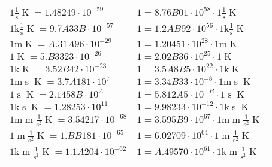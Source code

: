 \begin{center}
\begin{longtable}{l l}
{\color{black}$1 \bm{\mathrm{ }}{}\frac1{\operatorname{s}}{}{\operatorname{K}} = 1.48249\cdot10^{-59} $}   & {\color{black}$ 1 = 8.76B01\cdot10^{58} \cdot 1 \bm{\mathrm{ }}{}\frac1{\operatorname{s}}{}{\operatorname{K}}$}  \\
{\color{gray}$1 \bm{\mathrm{ k}}{}\frac1{\operatorname{s}}{}{\operatorname{K}} = 9.7A33B\cdot10^{-57} $}   & {\color{gray}$ 1 = 1.2AB92\cdot10^{56} \cdot 1 \bm{\mathrm{ k}}{}\frac1{\operatorname{s}}{}{\operatorname{K}}$}  \\
{\color{gray}$1 \bm{\mathrm{ m}}{}{}{}{\operatorname{K}} = A.31A96\cdot10^{-29} $}   & {\color{gray}$ 1 = 1.20451\cdot10^{28} \cdot 1 \bm{\mathrm{ m}}{}{}{}{\operatorname{K}}$}  \\
{\color{black}$1 \bm{\mathrm{ }}{}{}{}{\operatorname{K}} = 5.B3323\cdot10^{-26} $}   & {\color{black}$ 1 = 2.02B36\cdot10^{25} \cdot 1 \bm{\mathrm{ }}{}{}{}{\operatorname{K}}$}  \\
{\color{gray}$1 \bm{\mathrm{ k}}{}{}{}{\operatorname{K}} = 3.52B42\cdot10^{-23} $}   & {\color{gray}$ 1 = 3.5A8B5\cdot10^{22} \cdot 1 \bm{\mathrm{ k}}{}{}{}{\operatorname{K}}$}  \\
{\color{gray}$1 \bm{\mathrm{ m}}{}{\operatorname{s}}{}{\operatorname{K}} = 3.7A181\cdot10^{7} $}   & {\color{gray}$ 1 = 3.34B33\cdot10^{-8} \cdot 1 \bm{\mathrm{ m}}{}{\operatorname{s}}{}{\operatorname{K}}$}  \\
{\color{black}$1 \bm{\mathrm{ }}{}{\operatorname{s}}{}{\operatorname{K}} = 2.1458B\cdot10^{A} $}   & {\color{black}$ 1 = 5.812A5\cdot10^{-B} \cdot 1 \bm{\mathrm{ }}{}{\operatorname{s}}{}{\operatorname{K}}$}  \\
{\color{gray}$1 \bm{\mathrm{ k}}{}{\operatorname{s}}{}{\operatorname{K}} = 1.28253\cdot10^{11} $}   & {\color{gray}$ 1 = 9.98233\cdot10^{-12} \cdot 1 \bm{\mathrm{ k}}{}{\operatorname{s}}{}{\operatorname{K}}$}  \\
{\color{gray}$1 \bm{\mathrm{ m}}{\operatorname{m}}\frac1{\operatorname{s}^2}{}{\operatorname{K}} = 3.54217\cdot10^{-68} $}   & {\color{gray}$ 1 = 3.595B9\cdot10^{67} \cdot 1 \bm{\mathrm{ m}}{\operatorname{m}}\frac1{\operatorname{s}^2}{}{\operatorname{K}}$}  \\
{\color{black}$1 \bm{\mathrm{ }}{\operatorname{m}}\frac1{\operatorname{s}^2}{}{\operatorname{K}} = 1.BB181\cdot10^{-65} $}   & {\color{black}$ 1 = 6.02709\cdot10^{64} \cdot 1 \bm{\mathrm{ }}{\operatorname{m}}\frac1{\operatorname{s}^2}{}{\operatorname{K}}$}  \\
{\color{gray}$1 \bm{\mathrm{ k}}{\operatorname{m}}\frac1{\operatorname{s}^2}{}{\operatorname{K}} = 1.1A204\cdot10^{-62} $}   & {\color{gray}$ 1 = A.49570\cdot10^{61} \cdot 1 \bm{\mathrm{ k}}{\operatorname{m}}\frac1{\operatorname{s}^2}{}{\operatorname{K}}$}  \\

\end{longtable}
\end{center}
